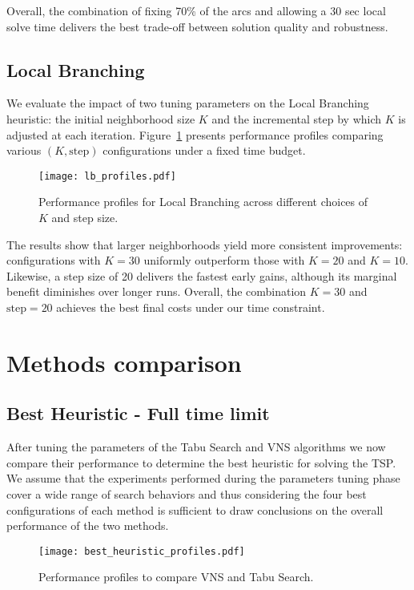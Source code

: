 Overall, the combination of fixing 70\% of the arcs and allowing a 30 sec local solve time delivers the best trade-off between solution quality and robustness.

\subsection{Local Branching}
\label{ssec:local-branch}

We evaluate the impact of two tuning parameters on the Local Branching heuristic: the initial neighborhood size \(K\) and the incremental step by which \(K\) is adjusted at each iteration. Figure~\ref{fig:lb-profiles} presents performance profiles comparing various \((K,\text{step})\) configurations under a fixed time budget.

\begin{figure}[H]
  \centering
  \texttt{[image: lb\_profiles.pdf]}
  \caption{Performance profiles for Local Branching across different choices of \(K\) and step size.}
  \label{fig:lb-profiles}
\end{figure}

The results show that larger neighborhoods yield more consistent improvements: configurations with \(K=30\) uniformly outperform those with \(K=20\) and \(K=10\). Likewise, a step size of 20 delivers the fastest early gains, although its marginal benefit diminishes over longer runs. Overall, the combination \(K=30\) and \(\text{step}=20\) achieves the best final costs under our time constraint.  

\section{Methods comparison}

\subsection{Best Heuristic - Full time limit}

After tuning the parameters of the Tabu Search and VNS algorithms we now compare their performance to determine the best heuristic for solving the TSP. We assume that the experiments performed during the parameters tuning phase cover a wide range of search behaviors and thus considering the four best configurations of each method is sufficient to draw conclusions on the overall performance of the two methods.

\begin{figure}[h]
  \centering
  \texttt{[image: best\_heuristic\_profiles.pdf]}
  \caption{Performance profiles to compare VNS and Tabu Search.}
  \label{fig:best-heuristic-profiles}
\end{figure}


